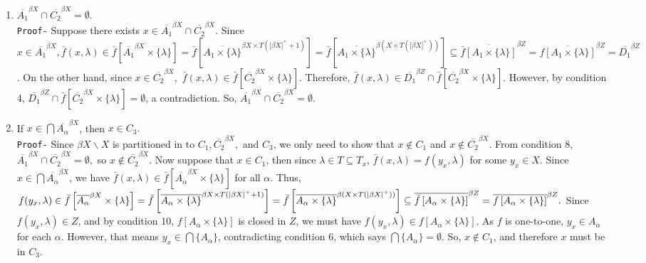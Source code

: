 \documentclass{article}
\begin{document}
\begin{enumerate}
	

\vskip 20pt

	
	\item $\overline{A_1}^{\beta X} \cap \overline{C_2}^{\beta X}=\emptyset.$ \\
	\texttt{Proof-} Suppose there exists $x\in \overline{A_1}^{\beta X}\cap \overline{C_2}^{\beta X}.$ Since $x\in \overline{A_1}^{\beta X}, \bar{f}(x,\lambda)\in \bar{f}\left[\overline{A_1}^{\beta X}\times \{\lambda\}\right] = \bar{f}\left[\overline{A_1 \times \{\lambda\}}^{\beta X\times T(|\beta X|^+ +1)}\right]=\bar{f}\left[\overline{A_1 \times \{\lambda\}}^{\beta (X\times T(|\beta X|^+ ))}\right]\subseteq \overline{\bar{f}\left[A_1\times\{\lambda\}\right]}^{\beta Z}=\overline{f\left[A_1\times\{\lambda\}\right]}^{\beta Z}=\overline{D_1}^{\beta Z}$. On the other hand, since $x\in \overline{C_2}^{\beta X},$ $\bar{f}(x,\lambda)\in \bar{f}\left[\overline{C_2}^{\beta X}\times \{\lambda\}\right].$ Therefore, $\bar{f}(x,\lambda)\in \overline{D_1}^{\beta Z} \cap \bar{f}\left[\overline{C_2}^{\beta X}\times \{\lambda\}\right].$ However, by condition 4,  $\overline{D_1}^{\beta Z} \cap \bar{f}\left[\overline{C_2}^{\beta X}\times \{\lambda\}\right]=\emptyset$, a contradiction. So, $\overline{A_1}^{\beta X} \cap \overline{C_2}^{\beta X}=\emptyset.$
	

\vskip 20pt
	
	\item If $x\in \bigcap \overline{A_\alpha}^{\beta X}$, then $x\in C_3.$\\
	\texttt{Proof-} Since $\beta X\backslash X$ is partitioned in to $C_1, \overline{C_2}^{\beta X},$ and $C_3$, we only need to show that $x\notin C_1$ and $x\notin \overline{C_2}^{\beta X}.$ From condition 8, $\overline{A_1}^{\beta X} \cap \overline{C_2}^{\beta X}=\emptyset,$ so $x\notin \overline{C_2}^{\beta X}.$  Now suppose that $x\in C_1$, then since $\lambda \in T \subseteq T_x$, $\bar{f}(x,\lambda)=f(y_x,\lambda)$ for some $y_x\in X$. Since $x\in \bigcap \overline{A_\alpha}^{\beta X}$, we have $\bar{f}(x,\lambda)\in \bar{f}\left[\overline{A_\alpha}^{\beta X}\times \{\lambda\}\right]$ for all $\alpha$. Thus, $f(y_x,\lambda)\in \bar{f}\left[\overline{A_\alpha}^{\beta X}\times \{\lambda\}\right]=\\ \bar{f}\left[\overline{A_\alpha \times \{\lambda\}}^{\beta X\times T(|\beta X|^+ +1)}\right]=\bar{f}\left[\overline{A_\alpha \times \{\lambda\}}^{\beta (X\times T(|\beta X|^+ ))}\right]\subseteq \overline{\bar{f}\left[A_\alpha \times \{\lambda\}\right]}^{\beta Z}\\
	=\overline{f\left[A_\alpha \times \{\lambda\}\right]}^{\beta Z}.$	              
	Since $f(y_x,\lambda)\in Z$, and by condition 10, $f\left[A_\alpha\times\{\lambda\}\right]$ is closed in $Z$, we must have $f(y_x,\lambda)\in f\left[A_\alpha\times\{\lambda\}\right]$. As $f$ is one-to-one, $y_x\in A_\alpha$ for each $\alpha$. However, that means $y_x\in \bigcap \{A_\alpha\}$, contradicting condition 6, which says $\bigcap \{A_\alpha\}=\emptyset$. So, $x\notin C_1$, and therefore $x$ must be in $C_3$. 



\end{enumerate}
\end{document}
